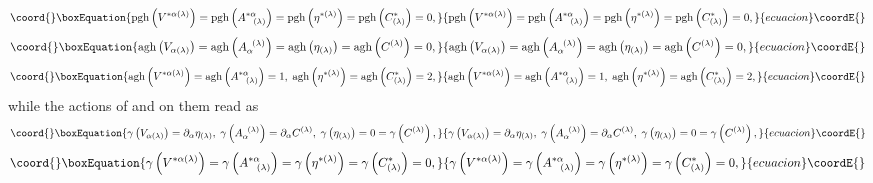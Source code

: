 \documentclass[a4paper,11pt]{article}
\begin{document}
\begin{equation}\coord{}\boxEquation{
\mathrm{pgh}\left( V^{*\alpha (\lambda )}\right) =\mathrm{pgh}\left(
A_{\;\;\;(\lambda )}^{*\alpha }\right) =\mathrm{pgh}\left( \eta ^{*(\lambda
)}\right) =\mathrm{pgh}\left( C_{(\lambda )}^{*}\right) =0,  \label{bf40}
}{
\mathrm{pgh}\left( V^{*\alpha (\lambda )}\right) =\mathrm{pgh}\left(
A_{\;\;\;(\lambda )}^{*\alpha }\right) =\mathrm{pgh}\left( \eta ^{*(\lambda
)}\right) =\mathrm{pgh}\left( C_{(\lambda )}^{*}\right) =0,  }{ecuacion}\coordE{}\end{equation}
\begin{equation}\coord{}\boxEquation{
\mathrm{agh}\left( V_{\alpha (\lambda )}\right) =\mathrm{agh}\left(
A_{\alpha }^{\;\;(\lambda )}\right) =\mathrm{agh}\left( \eta _{(\lambda
)}\right) =\mathrm{agh}\left( C^{(\lambda )}\right) =0,  \label{bf41}
}{
\mathrm{agh}\left( V_{\alpha (\lambda )}\right) =\mathrm{agh}\left(
A_{\alpha }^{\;\;(\lambda )}\right) =\mathrm{agh}\left( \eta _{(\lambda
)}\right) =\mathrm{agh}\left( C^{(\lambda )}\right) =0,  }{ecuacion}\coordE{}\end{equation}
\begin{equation}\coord{}\boxEquation{
\mathrm{agh}\left( V^{*\alpha (\lambda )}\right) =\mathrm{agh}\left(
A_{\;\;\;(\lambda )}^{*\alpha }\right) =1,\;\mathrm{agh}\left( \eta
^{*(\lambda )}\right) =\mathrm{agh}\left( C_{(\lambda )}^{*}\right) =2,
\label{bf42}
}{
\mathrm{agh}\left( V^{*\alpha (\lambda )}\right) =\mathrm{agh}\left(
A_{\;\;\;(\lambda )}^{*\alpha }\right) =1,\;\mathrm{agh}\left( \eta
^{*(\lambda )}\right) =\mathrm{agh}\left( C_{(\lambda )}^{*}\right) =2,
}{ecuacion}\coordE{}\end{equation}
while the actions of \myHighlight{$\delta $}\coordHE{} and \myHighlight{$\gamma $}\coordHE{} on them read as
\begin{equation}\coord{}\boxEquation{
\gamma \left( V_{\alpha (\lambda )}\right) =\partial _{\alpha }\eta
_{(\lambda )},\;\gamma \left( A_{\alpha }^{\;\;(\lambda )}\right) =\partial
_{\alpha }C^{(\lambda )},\;\gamma \left( \eta _{(\lambda )}\right) =0=\gamma
\left( C^{(\lambda )}\right) ,  \label{bf43}
}{
\gamma \left( V_{\alpha (\lambda )}\right) =\partial _{\alpha }\eta
_{(\lambda )},\;\gamma \left( A_{\alpha }^{\;\;(\lambda )}\right) =\partial
_{\alpha }C^{(\lambda )},\;\gamma \left( \eta _{(\lambda )}\right) =0=\gamma
\left( C^{(\lambda )}\right) ,  }{ecuacion}\coordE{}\end{equation}
\begin{equation}\coord{}\boxEquation{
\gamma \left( V^{*\alpha (\lambda )}\right) =\gamma \left( A_{\;\;\;(\lambda
)}^{*\alpha }\right) =\gamma \left( \eta ^{*(\lambda )}\right) =\gamma
\left( C_{(\lambda )}^{*}\right) =0,  \label{bf44}
}{
\gamma \left( V^{*\alpha (\lambda )}\right) =\gamma \left( A_{\;\;\;(\lambda
)}^{*\alpha }\right) =\gamma \left( \eta ^{*(\lambda )}\right) =\gamma
\left( C_{(\lambda )}^{*}\right) =0,  }{ecuacion}\coordE{}\end{equation}
\end{document}
